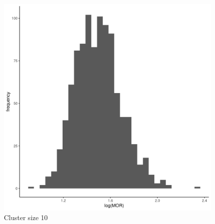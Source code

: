 \documentclass[
  letterpaper,
  DIV=11,
  numbers=noendperiod,
  titlepage]{scrartcl}
\begin{document}
\begin{figure}
\begin{minipage}[t]{0.24\linewidth}
{{\includegraphics{../../plots/two-lvl-ran-int/high-prev/hist_100_10_two_lvl_high_prev.png}

}

\caption{Cluster size 10}

}

\end{minipage}%
%
\begin{minipage}[t]{0.24\linewidth}

{\centering 

}
\end{minipage}
\end{figure}
\end{document}
